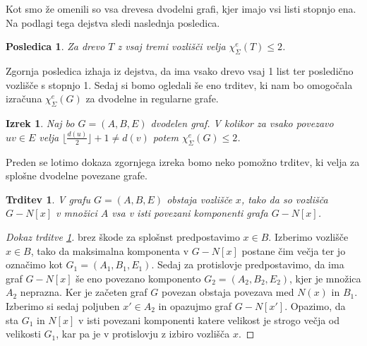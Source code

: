 \documentclass[12pt,a4paper,twoside]{article}
\theoremstyle{definition} %
\theoremstyle{plain} %
\newtheorem{izrek}[definicija]{Izrek}
\newtheorem{trditev}[definicija]{Trditev}
\newtheorem{posledica}[definicija]{Posledica}
\newcommand{\ec}{\chi_{\Sigma}^e}
\numberwithin{equation}{section}  %
\begin{document}
Kot smo že omenili so vsa drevesa dvodelni grafi, kjer imajo vsi listi stopnjo ena. Na podlagi tega dejstva sledi naslednja posledica.

\begin{posledica}
Za drevo $T$ z vsaj tremi vozlišči velja $\ec(T) \le 2$.
\end{posledica}

Zgornja posledica izhaja iz dejstva, da ima vsako drevo vsaj 1 list ter posledično vozlišče s stopnjo 1. Sedaj si bomo ogledali še eno trditev, ki nam bo omogočala izračuna $\ec(G)$ za dvodelne in regularne grafe.

\begin{izrek}
\label{dvoreg}
Naj bo $G = (A,B, E)$ dvodelen graf. V kolikor za vsako povezavo $uv \in E$ velja $\lfloor \frac{d(u)}{2} \rfloor + 1 \neq d(v) $ potem $\ec(G) \le 2$.
\end{izrek}

Preden se lotimo dokaza zgornjega izreka bomo neko pomožno trditev, ki velja za splošne dvodelne povezane grafe.
\begin{trditev}
\label{t1}
V grafu $G = (A, B, E)$ obstaja vozlišče $x$, tako da so vozlišča $G - N[x]$ v množici $A$ vsa v isti povezani komponenti grafa $G -  N[x]$.
\end{trditev}

\begin{proof}[Dokaz trditve \ref{t1}]
brez škode za splošnst predpostavimo $x \in B$. Izberimo vozlišče $x \in B$, tako da  maksimalna komponenta v $G - N[x]$ postane čim večja ter jo označimo kot $G_1 = (A_1, B_1, E_1)$. Sedaj za protislovje predpostavimo, da ima graf  $G - N[x]$ še eno povezano komponento $G_2 = (A_2, B_2, E_2)$, kjer je množica $A_2$ neprazna. Ker je začeten graf $G$ povezan obstaja povezava med $N(x)$ in $B_1$.  Izberimo si sedaj poljuben $x' \in A_2$ in opazujmo graf $G - N[x']$. Opazimo, da sta $G_1$ in $N[x]$ v isti povezani komponenti katere velikost je strogo večja od velikosti $G_1$, kar pa je v protislovju z izbiro vozlišča $x$.
\end{proof}
\end{document}
